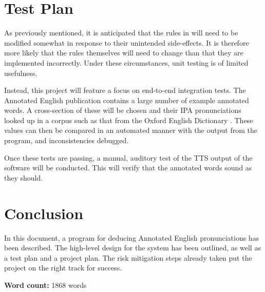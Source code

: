 \documentclass[fleqn]{llncs}
\begin{document}
\section{Test Plan}
As previously mentioned, it is anticipated that the rules in \cite{jose} will need to be modified somewhat in response to their unintended side-effects. It is therefore more likely that the rules themselves will need to change than that they are implemented incorrectly. Under these circumstances, unit testing is of limited usefulness.

Instead, this project will feature a focus on end-to-end integration tests. The Annotated English publication contains a large number of example annotated words. A cross-section of these will be chosen and their IPA pronunciations looked up in a corpus such as that from the Oxford English Dictionary \cite{dico}. These values can then be compared in an automated manner with the output from the program, and inconsistencies debugged.

Once these tests are passing, a manual, auditory test of the TTS output of the software will be conducted. This will verify that the annotated words sound as they should.

\section{Conclusion}
In this document, a program for deducing Annotated English \cite{jose} pronunciations has been described. The high-level design for the system has been outlined, as well as a test plan and a project plan. The risk mitigation steps already taken put the project on the right track for success.

\printbibliography

\vspace{10mm}

\textbf{Word count:} 1868 words
\end{document}
